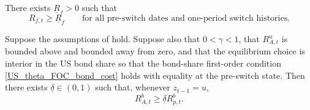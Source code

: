 \documentclass{article}
\begin{document}
\begin{ass}\label{ass_rf_lower_bound}
There exists $\underline R_f>0$ such that
\[
R_{f,t}\ge \underline R_f
\qquad\text{for all pre-switch dates and one-period switch histories.}
\]
\end{ass}

\begin{lem}\label{lem_uniform_natural_debt_slack}
Suppose the assumptions of  hold. Suppose also that $0<\gamma<1$, that $R_{A,t}^u$ is bounded above and bounded away from zero, and that the equilibrium choice is interior in the US bond share so that the bond-share first-order condition \eqref{US_theta_FOC_bond_cost} holds with equality at the pre-switch state. Then there exists $\underline\delta\in(0,1)$ such that, whenever $z_{t-1}=u$,
\[
R_{A,t}^b\ge \underline\delta R_{p,t}^b.
\]
\end{lem}
\end{document}
